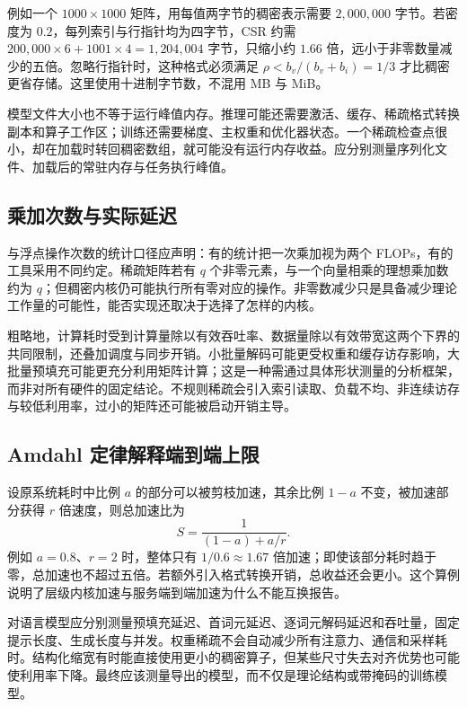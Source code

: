 \documentclass[UTF8,12pt,a4paper,fontset=fandol]{ctexart}
\begin{document}
例如一个 $1000\times1000$ 矩阵，用每值两字节的稠密表示需要 $2{,}000{,}000$ 字节。若密度为 $0.2$，每列索引与行指针均为四字节，CSR 约需 $200{,}000\times6+1001\times4=1{,}204{,}004$ 字节，只缩小约 $1.66$ 倍，远小于非零数量减少的五倍。忽略行指针时，这种格式必须满足 $\rho<b_v/(b_v+b_i)=1/3$ 才比稠密更省存储。这里使用十进制字节数，不混用 MB 与 MiB。

模型文件大小也不等于运行峰值内存。推理可能还需要激活、缓存、稀疏格式转换副本和算子工作区；训练还需要梯度、主权重和优化器状态。一个稀疏检查点很小，却在加载时转回稠密数组，就可能没有运行内存收益。应分别测量序列化文件、加载后的常驻内存与任务执行峰值。

\subsection{乘加次数与实际延迟}
与浮点操作次数的统计口径应声明：有的统计把一次乘加视为两个 FLOPs，有的工具采用不同约定。稀疏矩阵若有 $q$ 个非零元素，与一个向量相乘的理想乘加数约为 $q$；但稠密内核仍可能执行所有零对应的操作。非零数减少只是具备减少理论工作量的可能性，能否实现还取决于选择了怎样的内核。

粗略地，计算耗时受到计算量除以有效吞吐率、数据量除以有效带宽这两个下界的共同限制，还叠加调度与同步开销。小批量解码可能更受权重和缓存访存影响，大批量预填充可能更充分利用矩阵计算；这是一种需通过具体形状测量的分析框架，而非对所有硬件的固定结论。不规则稀疏会引入索引读取、负载不均、非连续访存与较低利用率，过小的矩阵还可能被启动开销主导。

\subsection{Amdahl 定律解释端到端上限}
设原系统耗时中比例 $a$ 的部分可以被剪枝加速，其余比例 $1-a$ 不变，被加速部分获得 $r$ 倍速度，则总加速比为
\begin{equation}
 S=\frac{1}{(1-a)+a/r}.
 \label{eq:prune-amdahl}
\end{equation}
例如 $a=0.8$、$r=2$ 时，整体只有 $1/0.6\approx1.67$ 倍加速；即使该部分耗时趋于零，总加速也不超过五倍。若额外引入格式转换开销，总收益还会更小。这个算例说明了层级内核加速与服务端到端加速为什么不能互换报告。

对语言模型应分别测量预填充延迟、首词元延迟、逐词元解码延迟和吞吐量，固定提示长度、生成长度与并发。权重稀疏不会自动减少所有注意力、通信和采样耗时。结构化缩宽有时能直接使用更小的稠密算子，但某些尺寸失去对齐优势也可能使利用率下降。最终应该测量导出的模型，而不仅是理论结构或带掩码的训练模型。
\end{document}
